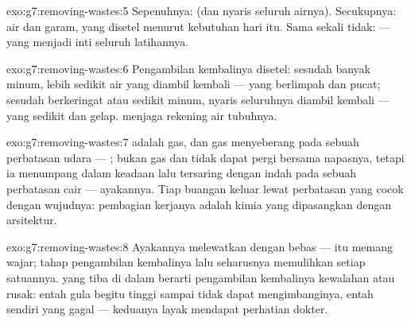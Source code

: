 \begin{solution}{exo:g7:removing-wastes:5}
Sepenuhnya:  (dan nyaris seluruh airnya). Secukupnya: air
dan garam, yang disetel menurut kebutuhan hari itu. Sama sekali tidak:
 --- yang menjadi inti seluruh latihannya.
\end{solution}

\begin{solution}{exo:g7:removing-wastes:6}
Pengambilan kembalinya disetel: sesudah banyak minum, lebih sedikit
air yang diambil kembali ---  yang berlimpah dan pucat; sesudah
berkeringat atau sedikit minum, nyaris seluruhnya diambil kembali ---
 yang sedikit dan gelap.  menjaga rekening air tubuhnya.
\end{solution}

\begin{solution}{exo:g7:removing-wastes:7}
 adalah gas, dan gas menyeberang pada sebuah perbatasan
udara --- ;  bukan gas dan tidak dapat pergi bersama
napasnya, tetapi ia menumpang dalam keadaan  lalu tersaring
dengan indah pada sebuah perbatasan cair --- ayakannya. Tiap buangan
keluar lewat perbatasan yang cocok dengan wujudnya: pembagian kerjanya
adalah kimia yang dipasangkan dengan arsitektur.
\end{solution}

\begin{solution}{exo:g7:removing-wastes:8}
Ayakannya melewatkan  dengan bebas --- itu memang wajar; tahap
pengambilan kembalinya lalu seharusnya memulihkan setiap satuannya.
 yang tiba di dalam  berarti pengambilan kembalinya
kewalahan atau rusak: entah gula  begitu tinggi sampai
 tidak dapat mengimbanginya, entah  sendiri
yang gagal --- keduanya layak mendapat perhatian dokter.
\end{solution}

